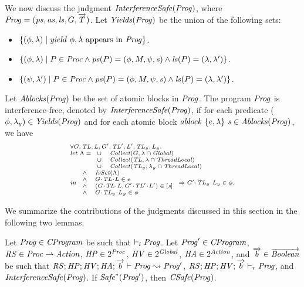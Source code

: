 We now discuss the judgment $\mathit{InterferenceSafe}(\mathit{Prog})$,
where $\mathit{Prog} = (\mathit{ps}, \mathit{as}, \mathit{ls}, G, \overrightarrow{T})$. 
Let $\mathit{Yields}(\mathit{Prog})$ be the union of the following sets:
\begin{itemize}
\item
$\{(\phi,\lambda) \mid \mathit{yield}\ \phi,\lambda~\mathrm{appears~in~\mathit{Prog}}\}$.
\item
$\{(\phi,\lambda) \mid P \in \mathit{Proc} \wedge \mathit{ps}(P) = (\phi, M, \psi, \mathit{s}) \wedge \mathit{ls}(P) = (\lambda,\lambda')\}$.
\item
$\{(\psi,\lambda') \mid P \in \mathit{Proc} \wedge \mathit{ps}(P) = (\phi, M, \psi, \mathit{s}) \wedge \mathit{ls}(P) = (\lambda,\lambda')\}$.
\end{itemize}
Let $\mathit{Ablocks}(\mathit{Prog})$ be the set of atomic blocks in $\mathit{Prog}$.
The program $\mathit{Prog}$ is interference-free, denoted by $\mathit{InterferenceSafe}(\mathit{Prog})$,
if for each predicate ($\phi,\lambda_y) \in \mathit{Yields}(\mathit{Prog})$ and 
for each atomic block $\mathit{ablock}\ {\{e,\lambda\}}\ {\mathit{s}} \in \mathit{Ablocks}(\mathit{Prog})$, we have
\[
\scriptsize{
\begin{array}{l}
\forall \varsG,\varsTL,\varsL,\varsG',\varsTL',\varsL',\varsTL_y,\varsL_y.\\ 
\mathit{let}\ \Lambda =
\begin{array}[t]{ll}
\cup & \Collect(\varsG, \lins \cap \Global) \\
\cup & \Collect(\varsTL, \lins \cap \ThreadLocal) \\
\cup & \Collect(\varsTL_y, \lins_y \cap \ThreadLocal) 
\end{array} \\
\mathit{in}\
\begin{array}{ll}
\wedge & \IsSet(\Lambda) \\
\wedge & \MakeStore{\varsG}{\varsTL}{\varsL} \in e \\
\wedge & (\MakeStore{\varsG}{\varsTL}{\varsL}, \MakeStore{\varsG'}{\varsTL'}{\varsL'}) \in \trel{\stmt} \\
\wedge & \MakeStore{\varsG}{\varsTL_y}{\varsL_y} \in \phi
\end{array}
\Rightarrow \MakeStore{\varsG'}{\varsTL_y}{\varsL_y} \in \phi.
\end{array}
}
\]

We summarize the contributions of the judgments discussed in this section in the following two lemmas.
\begin{lemma}
Let $\mathit{Prog} \in \mathit{CProgram}$ be such that $\vdash_l \mathit{Prog}$.
Let $\mathit{Prog}' \in \mathit{CProgram}$, $\mathit{RS} \in \mathit{Proc} \rightharpoonup \mathit{Action}$, $\mathit{HP} \in 2^{\mathit{Proc}}$, $\mathit{HV} \in 2^{\mathit{Global}}$, $\mathit{HA} \in 2^{\mathit{Action}}$,
and $\overrightarrow{b} \in \overrightarrow{\mathit{Boolean}}$ be such that 
$\mathit{RS};\mathit{HP};\mathit{HV};\mathit{HA};\overrightarrow{b} \vdash \mathit{Prog} \leadsto \mathit{Prog}'$, $\mathit{RS};\mathit{HP};\mathit{HV};\overrightarrow{b} \vdash_r \mathit{Prog}$, and
$\mathit{InterferenceSafe}(\mathit{Prog})$.
If $\mathit{Safe}^*(\mathit{Prog}')$, then $\mathit{CSafe}(\mathit{Prog})$.
\end{lemma}

